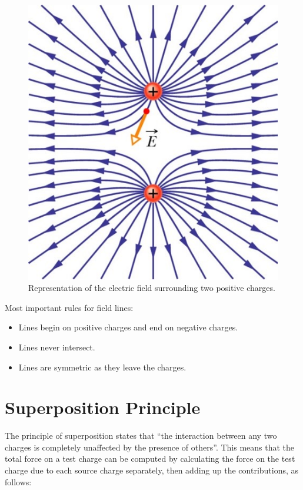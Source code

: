 \documentclass[
  letterpaper,
  DIV=11,
  numbers=noendperiod]{scrreprt}
\begin{document}
\begin{figure}[H]

{\centering \includegraphics{Figures/Efield_like.png}

}

\caption{Representation of the electric field surrounding two positive
charges.}

\end{figure}%

Most important rules for field lines:

\begin{itemize}
\item
  Lines begin on positive charges and end on negative charges.
\item
  Lines never intersect.
\item
  Lines are symmetric as they leave the charges.
\end{itemize}

\section{Superposition Principle}\label{superposition-principle}

The principle of superposition states that ``the interaction between any
two charges is completely unaffected by the presence of others''. This
means that the total force on a test charge can be computed by
calculating the force on the test charge due to each source charge
separately, then adding up the contributions, as follows:
\end{document}
